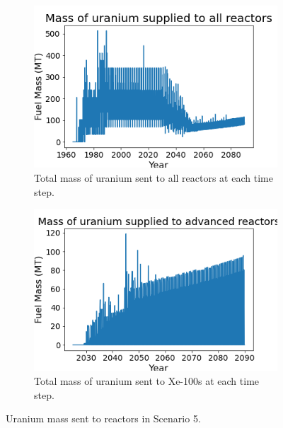 \begin{figure}
    \centering
    \begin{subfigure}{0.4\textwidth}
        \centering
        \includegraphics[scale=0.3]{figures/fuelsupply_scenarios_5.png}
        \caption{Total mass of uranium sent to all reactors at each time step.}
        \label{fig:totalfuel_5}
    \end{subfigure}
    \begin{subfigure}{0.4\textwidth}
        \centering
        \includegraphics[scale=0.3]{figures/advancedRX_fuelsupply_scenarios_5.png}
        \caption{Total mass of uranium sent to Xe-100s at each time step.}
        \label{fig:haleu_5}
    \end{subfigure}
    \caption{Uranium mass sent to reactors in Scenario 5.}
    \label{fig:fuel_5}
\end{figure}

